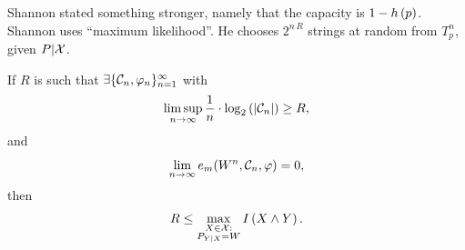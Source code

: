 Shannon stated something stronger, namely that the capacity is $1 - h\left({p}\right)$.
Shannon uses ``maximum likelihood''.
He chooses $2^{n \, R}$ strings at random from $T^n_p$, given $P|\mathcal{X}$.

\begin{thm}
	If $R$ is such that $\exists \{\mathcal{C}_n, \varphi_n\}_{n=1}^\infty$ with
	\begin{equation*}
		\limsup_{n \to \infty}
		\frac{1}{n} \cdot \log_2 \left( {\left|{\mathcal{C}_n}\right|} \right) \ge R,
	\end{equation*}
	and
	\begin{equation*}
		\lim_{n \to \infty} e_m (W^n, \mathcal{C}_n, \varphi) = 0,
	\end{equation*}
	then
	\begin{equation*}
		R \le \max_{
			\substack{
				X \in \mathcal{X} : \\
				P_{Y|X} = W
			}
		}
		I \left( {X \land Y} \right).
	\end{equation*}
\end{thm}

